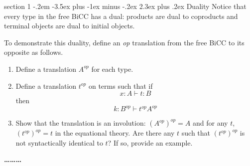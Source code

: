 \documentclass[12pt]{article}
\makeatletter
\newenvironment{problem}{\@startsection
       {section}
       {1}
       {-.2em}
       {-3.5ex plus -1ex minus -.2ex}
       {2.3ex plus .2ex}
       {\pagebreak[3]%
       \large\bf\noindent{Problem }
       }
       }
       {%
       \begin{center}\large\bf \ldots\ldots\ldots\end{center}}
\makeatother
\begin{document}
\begin{problem}{Duality}
  Notice that every type in the free BiCC has a dual: products are
  dual to coproducts and terminal objects are dual to initial objects.

  To demonstrate this duality, define an \emph{op} translation from
  the free BiCC to its opposite as follows.
  \begin{enumerate}
  \item Define a translation $A^{op}$ for each type.
  \item Define a translation $t^{op}$ on terms such that if
    \[ x : A \vdash t : B \]
    then
    \[ k: B^{op} \vdash t^{op} A^{op} \]
  \item Show that the translation is an involution: $(A^{op})^{op} = A$
    and for any $t$, $(t^{op})^{op} = t$ in the equational theory. Are
    there any $t$ such that $(t^{op})^{op}$ is not syntactically
    identical to $t$? If so, provide an example.
  \end{enumerate}
\end{problem}
\end{document}
